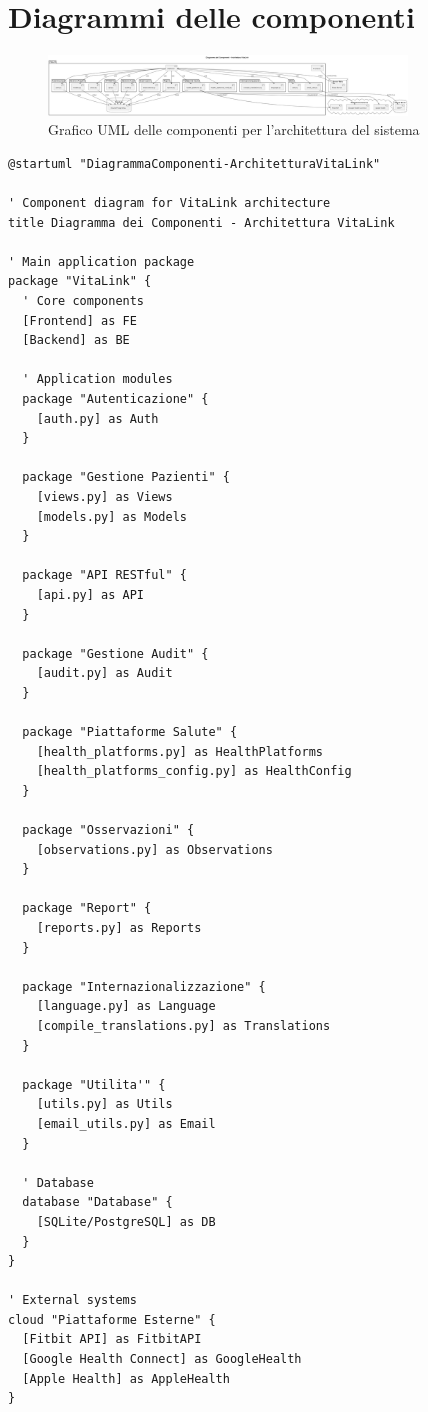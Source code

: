 \documentclass[12pt,a4paper,oneside]{report}
\begin{document}
\section{Diagrammi delle componenti}
\begin{figure}[H]
    \centering
    \includegraphics[width=0.85\textwidth]{images/uml/SystemArchitecture.png}
    \caption{Grafico UML delle componenti per l'architettura del sistema}
    \label{fig:uml-comp-graph}
\end{figure}
\begin{lstlisting}[basicstyle=\small\ttfamily, breaklines=true]
@startuml "DiagrammaComponenti-ArchitetturaVitaLink"

' Component diagram for VitaLink architecture
title Diagramma dei Componenti - Architettura VitaLink

' Main application package
package "VitaLink" {
  ' Core components
  [Frontend] as FE
  [Backend] as BE
  
  ' Application modules
  package "Autenticazione" {
    [auth.py] as Auth
  }
  
  package "Gestione Pazienti" {
    [views.py] as Views
    [models.py] as Models
  }
  
  package "API RESTful" {
    [api.py] as API
  }
  
  package "Gestione Audit" {
    [audit.py] as Audit
  }
  
  package "Piattaforme Salute" {
    [health_platforms.py] as HealthPlatforms
    [health_platforms_config.py] as HealthConfig
  }
  
  package "Osservazioni" {
    [observations.py] as Observations
  }
  
  package "Report" {
    [reports.py] as Reports
  }
  
  package "Internazionalizzazione" {
    [language.py] as Language
    [compile_translations.py] as Translations
  }
  
  package "Utilita'" {
    [utils.py] as Utils
    [email_utils.py] as Email
  }
  
  ' Database
  database "Database" {
    [SQLite/PostgreSQL] as DB
  }
}

' External systems
cloud "Piattaforme Esterne" {
  [Fitbit API] as FitbitAPI
  [Google Health Connect] as GoogleHealth
  [Apple Health] as AppleHealth
}


\end{lstlisting}
\end{document}
